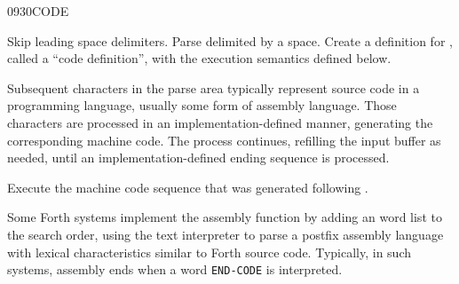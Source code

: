 \pagebreak
\begin{worddef}{0930}{CODE}
\item {}

	Skip leading space delimiters. Parse  delimited by a
	space. Create a definition for , called a ``code
	definition'', with the execution semantics defined below.

	Subsequent characters in the parse area typically represent
	source code in a programming language, usually some form of
	assembly language. Those characters are processed in an
	implementation-defined manner, generating the corresponding
	machine code. The process continues, refilling the input buffer
	as needed, until an implementation-defined ending sequence is
	processed.

\execute[name]

	Execute the machine code sequence that was generated following
	.


	\begin{rationale} %
		Some Forth systems implement the assembly function by adding
		an  word list to the search order,
		using the text interpreter to parse a postfix assembly
		language with lexical characteristics similar to Forth source
		code. Typically, in such systems, assembly ends when a word
		\texttt{END-CODE} is interpreted.
	\end{rationale}
\end{worddef}


